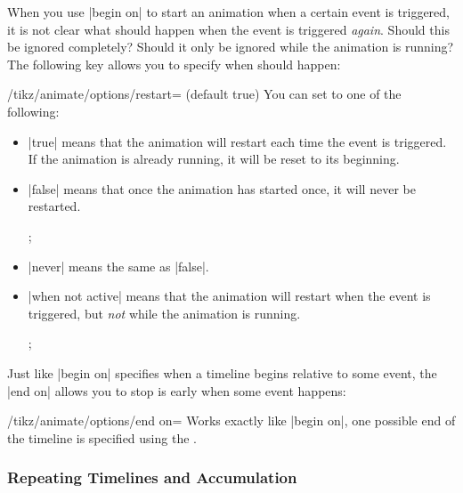 When you use |begin on| to start an animation when a certain event is
triggered, it is not clear what should happen when the event is
triggered \emph{again}. Should this be ignored completely? Should it
only be ignored while the animation is running? The following key
allows you to specify when should happen:

\begin{key}{/tikz/animate/options/restart= (default true)}
  You can set  to one of the following:
  \begin{itemize}
  \item |true| means that the animation will restart each time the
    event is triggered. If the animation is already running, it will
    be reset to its beginning.
  \item |false| means that once the animation has started once, it
    will never be restarted.
\begin{codeexample}[width=2cm]
\tikz 
  ; 
\end{codeexample}  
  \item |never| means the same as |false|.
  \item |when not active| means that the animation will restart when
    the event is triggered, but \emph{not} while the animation is
    running.     
\begin{codeexample}[width=2cm]
\tikz 
  ; 
\end{codeexample}  
  \end{itemize}
\end{key}

Just like |begin on| specifies when a timeline begins relative to some
event, the |end on| allows you to stop is early when some event
happens:

\begin{key}{/tikz/animate/options/end on=}
  Works exactly like |begin on|, one possible end of the timeline is
  specified using the .
\end{key}


\subsubsection{Repeating Timelines and Accumulation}

